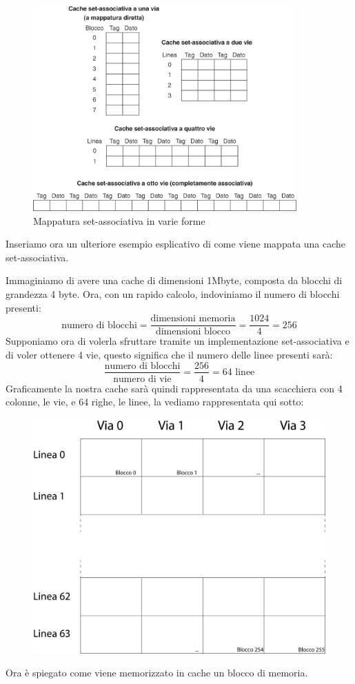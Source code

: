 \documentclass[class=book, crop=false, oneside]{standalone}
\begin{document}
\begin{figure}[!h]
	\centering
	\includegraphics[width=0.9\textwidth,keepaspectratio]{mappatura-set-associativa}
	\caption{Mappatura set-associativa in varie forme}
\end{figure}


Inseriamo ora un ulteriore esempio esplicativo di come viene mappata una cache set-associativa.

Immaginiamo di avere una cache di dimensioni 1Mbyte, composta da blocchi di grandezza 4 byte.
Ora, con un rapido calcolo, indoviniamo il numero di blocchi presenti:
\begin{equation}
	\textrm{numero di blocchi} = \frac{\textrm{dimensioni memoria}}{\textrm{dimensioni blocco}} = \frac{1024}{4} = 256
\end{equation}
Supponiamo ora di volerla sfruttare tramite un implementazione set-associativa e di voler ottenere 4 vie, questo significa che il numero delle linee presenti sarà:
\begin{equation}
	\frac{\textrm{numero di blocchi}}{\textrm{numero di vie}} = \frac{256}{4} = 64 \textrm{ linee}
\end{equation}
Graficamente la nostra cache sarà quindi rappresentata da una scacchiera con 4 colonne, le vie, e 64 righe, le linee, la vediamo rappresentata qui sotto:
\begin{figure}
	\centering
	\includegraphics[width=.7\textwidth, keepaspectratio]{esempio-associativa}
\end{figure}
Ora è spiegato come viene memorizzato in cache un blocco di memoria.
\end{document}
